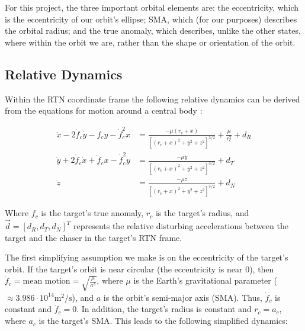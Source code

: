 \documentclass[conference]{IEEEtran}
\begin{document}
For this project, the three important orbital elements are: the eccentricity,
which is the eccentricity of our orbit's ellipse; SMA, which (for our purposes)
describes the orbital radius; and the true anomaly, which describes, unlike the
other states, where within the orbit we are, rather than the shape or
orientation of the orbit.


\subsection{Relative Dynamics}

Within the RTN coordinate frame the following relative dynamics can be derived
from the equations for motion around a central body \cite{sullivan_comprehensive_2017}:

\begin{equation}
    \label{eq:full-dynamics}
    \begin{split}
        \ddot{x} - 2\dot{f}_c\dot{y} - \ddot{f}_c y - \dot{f}_c^2 x & =
            \frac{-\mu(r_c + x)}{\left[ (r_c+x)^2 + y^2 + z^2\right]^{3/2}} +
            \frac{\mu}{r_c^2} + d_R \\
        \ddot{y} + 2\dot{f}_c\dot{x} + \ddot{f}_c x - \dot{f}_c^2 y & =
            \frac{-\mu y}{\left[ (r_c+x)^2 + y^2 + z^2\right]^{3/2}} + d_T \\
        \ddot{z} & = \frac{-\mu z}{\left[ (r_c+x)^2 + y^2 + z^2\right]^{3/2}} +
            d_N
    \end{split}
\end{equation}

Where $f_c$ is the target's true anomaly, $r_c$ is the target's radius, and
$\vec{d} = [d_R, d_T, d_N]^T$ represents the relative disturbing accelerations
between the target and the chaser in the target's RTN frame.

The first simplifying assumption we make is on the eccentricity of the target's
orbit. If the target's orbit is near circular (the eccentricity is near 0),
then $\dot{f}_c = \text{mean motion} = \sqrt{\frac{\mu}{a^3}}$, where $\mu$ is
the Earth's gravitational parameter ($\approx 3.986\cdot10^{14} \text{
m}^2/\text{s}$), and $a$ is the orbit's semi-major axis (SMA). Thus,
$\dot{f}_c$ is constant and $\ddot{f}_c = 0$. In addition, the target's radius
is constant and $r_c = a_c$, where $a_c$ is the target's SMA. This leads to the
following simplified dynamics:
\end{document}
